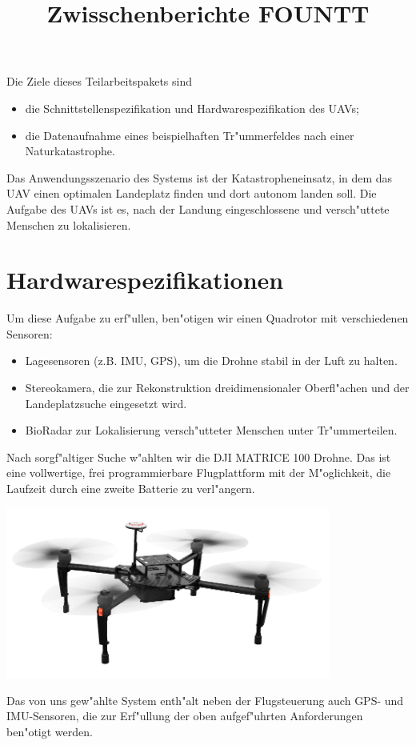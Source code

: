 \documentclass[a4paper]{article}
\title{Zwisschenberichte FOUNTT}
\begin{document}
\maketitle

Die Ziele dieses Teilarbeitspakets sind
\begin{itemize}
\item die Schnittstellenspezifikation und Hardwarespezifikation des UAVs; 
\item die Datenaufnahme eines beispielhaften Tr"ummerfeldes nach einer Naturkatastrophe.
\end{itemize}
Das Anwendungsszenario des Systems ist der Katastropheneinsatz, in dem das UAV einen optimalen Landeplatz finden und dort autonom landen soll. Die Aufgabe des UAVs ist es, nach der Landung eingeschlossene und versch"uttete Menschen zu lokalisieren.
   

\section*{Hardwarespezifikationen} 
Um diese Aufgabe zu erf"ullen, ben"otigen wir einen Quadrotor mit verschiedenen Sensoren: 
\begin{itemize}
\item Lagesensoren (z.B. IMU, GPS), um die Drohne stabil in der Luft zu halten. 
\item Stereokamera, die zur Rekonstruktion dreidimensionaler Oberfl"achen und der Landeplatzsuche eingesetzt wird.
\item BioRadar zur Lokalisierung versch"utteter Menschen unter Tr"ummerteilen. 
\end{itemize}
Nach sorgf"altiger Suche w"ahlten wir die DJI MATRICE 100 Drohne. 
Das ist eine vollwertige, frei programmierbare Flugplattform mit der M"oglichkeit, die Laufzeit durch eine zweite Batterie zu verl"angern.
\begin{center}
\includegraphics[width=0.8\textwidth]{Matrice_100.png}
\end{center}
Das von uns gew"ahlte System enth"alt neben der Flugsteuerung auch GPS- und IMU-Sensoren, die zur Erf"ullung der oben aufgef"uhrten Anforderungen ben"otigt werden.
\end{document}
